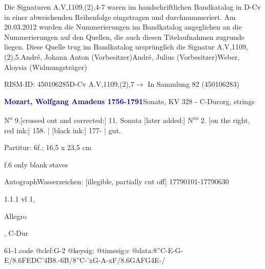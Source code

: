 \documentclass[a4paper, twocolumn, 11pt]{book}
\begin{document}
\newline %
\par Die Signaturen A.V,1109,(2),4-7 waren im handschriftlichen Bandkatalog in D-Cv in einer abweichenden Reihenfolge eingetragen und durchnummeriert. Am 20.03.2012 wurden die Nummerierungen im Bandkatalog angeglichen an die Nummerierungen auf den Quellen, die auch diesen Titelaufnahmen zugrunde liegen. Diese Quelle trug im Bandkatalog ursprünglich die Signatur A.V,1109,(2),5.\newline André, Johann Anton  (Vorbesitzer)\newline André, Julius  (Vorbesitzer)\newline Weber, Aloysia  (Widmungsträger)
\par RISM-ID: 450106285\newline D-Cv  A.V,1109,(2),7\newline $\rightarrow$ In Sammlung 82 (450106283)
      
\par \vspace{16pt} \textcolor{darkblue}{\textbf{Mozart, Wolfgang Amadeus  1756-1791}}\hfillplus{[61]}\newline Sonate, KV 328 - C-Dur\newline org, strings
\par \begin{itshape} N\textsuperscript{o} 9.[crossed out and corrected:] 11. Sonata [later added:] N\textsuperscript{r}\textsuperscript{o} 2. [on the right, red ink:] 158. | [black ink:] 177- | gut.\end{itshape} 
\par \textcolor{darkblue}{}  Partitur: 6f.; 16,5 x 23,5 cm\newline \begin{small} f.6 only blank staves\end{small} \newline Autograph\newline Wasserzeichen: [illegible, partially cut off]  17790101-17790630
\par 1.1.1  vl 1, \begin{itshape}Allegro\end{itshape}, C-Dur  
\begin{filecontents*}{61-1.code}
@clef:G-2
@keysig:
@timesig:c
@data:8''C-E-G-E/8.6{FEDC}'4B8.-6B/8''C-'xG-A-xF/8.6{GAFG}4E-/
\end{filecontents*}
\end{document}
